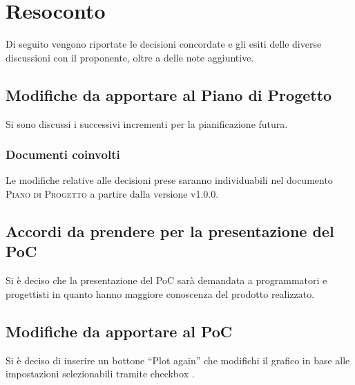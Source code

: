 \documentclass{article}
\begin{document}
\section{Resoconto}
\label{sec:resoconto}

Di seguito vengono riportate le decisioni concordate e gli esiti delle diverse discussioni con il proponente, oltre a 
delle note aggiuntive.

\subsection{Modifiche da apportare al Piano di Progetto}
\label{itm:1}

Si sono discussi i successivi incrementi per la pianificazione futura.

\subsubsection*{Documenti coinvolti}
Le modifiche relative alle decisioni prese saranno individuabili nel documento \textsc{Piano di Progetto} a partire 
dalla versione v1.0.0.

\subsection{Accordi da prendere per la presentazione del PoC}
\label{itm:2}

Si è deciso che la presentazione del PoC sarà demandata a programmatori e progettisti in quanto hanno maggiore conoscenza del prodotto realizzato. 

\subsection{Modifiche da apportare al PoC}
\label{itm:3}

Si è deciso di inserire un bottone “Plot again” che modifichi il grafico in base alle impostazioni selezionabili tramite checkbox .
\end{document}
